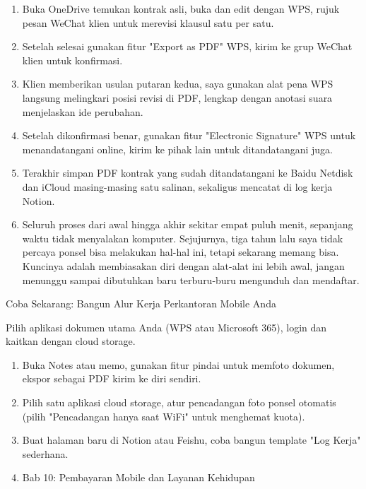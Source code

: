 \begin{enumerate}
  \item Buka OneDrive temukan kontrak asli, buka dan edit dengan WPS, rujuk pesan WeChat klien untuk merevisi klausul satu per satu.
  \item Setelah selesai gunakan fitur "Export as PDF" WPS, kirim ke grup WeChat klien untuk konfirmasi.
  \item Klien memberikan usulan putaran kedua, saya gunakan alat pena WPS langsung melingkari posisi revisi di PDF, lengkap dengan anotasi suara menjelaskan ide perubahan.
  \item Setelah dikonfirmasi benar, gunakan fitur "Electronic Signature" WPS untuk menandatangani online, kirim ke pihak lain untuk ditandatangani juga.
  \item Terakhir simpan PDF kontrak yang sudah ditandatangani ke Baidu Netdisk dan iCloud masing-masing satu salinan, sekaligus mencatat di log kerja Notion.
  \item Seluruh proses dari awal hingga akhir sekitar empat puluh menit, sepanjang waktu tidak menyalakan komputer. Sejujurnya, tiga tahun lalu saya tidak percaya ponsel bisa melakukan hal-hal ini, tetapi sekarang memang bisa. Kuncinya adalah membiasakan diri dengan alat-alat ini lebih awal, jangan menunggu sampai dibutuhkan baru terburu-buru mengunduh dan mendaftar.
\end{enumerate}

Coba Sekarang: Bangun Alur Kerja Perkantoran Mobile Anda

\begin{tcbpractice}{Pilih aplikasi dokumen utama Anda (WPS atau Microsoft 365), login dan kaitkan dengan cloud storage.}
\begin{enumerate}
  \item Buka Notes atau memo, gunakan fitur pindai untuk memfoto dokumen, ekspor sebagai PDF kirim ke diri sendiri.
  \item Pilih satu aplikasi cloud storage, atur pencadangan foto ponsel otomatis (pilih "Pencadangan hanya saat WiFi" untuk menghemat kuota).
  \item Buat halaman baru di Notion atau Feishu, coba bangun template "Log Kerja" sederhana.
  \item Bab 10: Pembayaran Mobile dan Layanan Kehidupan
\end{enumerate}

\end{tcbpractice}
